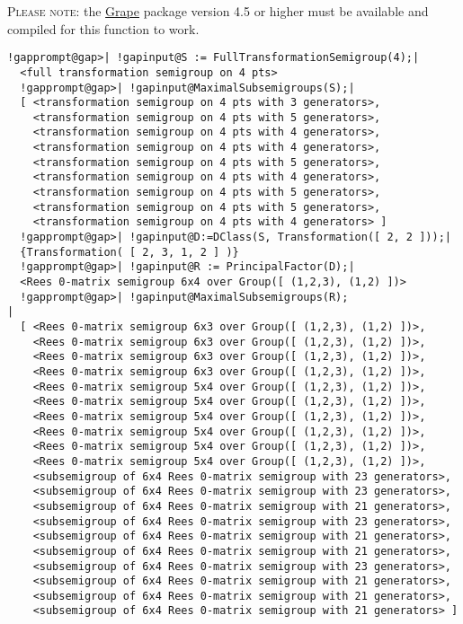 \documentclass[a4paper,11pt]{report}
\begin{document}
{{{ \textsc{Please note:} the \href{http://www.maths.qmul.ac.uk/~leonard/grape/} {Grape} package version 4.5 or higher must be available and compiled for this function
to work. 
\begin{Verbatim}[commandchars=!@|,fontsize=\small,frame=single,label=Example]
  !gapprompt@gap>| !gapinput@S := FullTransformationSemigroup(4);|
  <full transformation semigroup on 4 pts>
  !gapprompt@gap>| !gapinput@MaximalSubsemigroups(S);|
  [ <transformation semigroup on 4 pts with 3 generators>, 
    <transformation semigroup on 4 pts with 5 generators>, 
    <transformation semigroup on 4 pts with 4 generators>, 
    <transformation semigroup on 4 pts with 4 generators>, 
    <transformation semigroup on 4 pts with 5 generators>, 
    <transformation semigroup on 4 pts with 4 generators>, 
    <transformation semigroup on 4 pts with 5 generators>, 
    <transformation semigroup on 4 pts with 5 generators>, 
    <transformation semigroup on 4 pts with 4 generators> ]
  !gapprompt@gap>| !gapinput@D:=DClass(S, Transformation([ 2, 2 ]));|
  {Transformation( [ 2, 3, 1, 2 ] )}
  !gapprompt@gap>| !gapinput@R := PrincipalFactor(D);|
  <Rees 0-matrix semigroup 6x4 over Group([ (1,2,3), (1,2) ])>
  !gapprompt@gap>| !gapinput@MaximalSubsemigroups(R);                                       |
  [ <Rees 0-matrix semigroup 6x3 over Group([ (1,2,3), (1,2) ])>, 
    <Rees 0-matrix semigroup 6x3 over Group([ (1,2,3), (1,2) ])>, 
    <Rees 0-matrix semigroup 6x3 over Group([ (1,2,3), (1,2) ])>, 
    <Rees 0-matrix semigroup 6x3 over Group([ (1,2,3), (1,2) ])>, 
    <Rees 0-matrix semigroup 5x4 over Group([ (1,2,3), (1,2) ])>, 
    <Rees 0-matrix semigroup 5x4 over Group([ (1,2,3), (1,2) ])>, 
    <Rees 0-matrix semigroup 5x4 over Group([ (1,2,3), (1,2) ])>, 
    <Rees 0-matrix semigroup 5x4 over Group([ (1,2,3), (1,2) ])>, 
    <Rees 0-matrix semigroup 5x4 over Group([ (1,2,3), (1,2) ])>, 
    <Rees 0-matrix semigroup 5x4 over Group([ (1,2,3), (1,2) ])>, 
    <subsemigroup of 6x4 Rees 0-matrix semigroup with 23 generators>, 
    <subsemigroup of 6x4 Rees 0-matrix semigroup with 23 generators>, 
    <subsemigroup of 6x4 Rees 0-matrix semigroup with 21 generators>, 
    <subsemigroup of 6x4 Rees 0-matrix semigroup with 23 generators>, 
    <subsemigroup of 6x4 Rees 0-matrix semigroup with 21 generators>, 
    <subsemigroup of 6x4 Rees 0-matrix semigroup with 21 generators>, 
    <subsemigroup of 6x4 Rees 0-matrix semigroup with 23 generators>, 
    <subsemigroup of 6x4 Rees 0-matrix semigroup with 21 generators>, 
    <subsemigroup of 6x4 Rees 0-matrix semigroup with 21 generators>, 
    <subsemigroup of 6x4 Rees 0-matrix semigroup with 21 generators> ]
\end{Verbatim}
 }

}}
\end{document}
